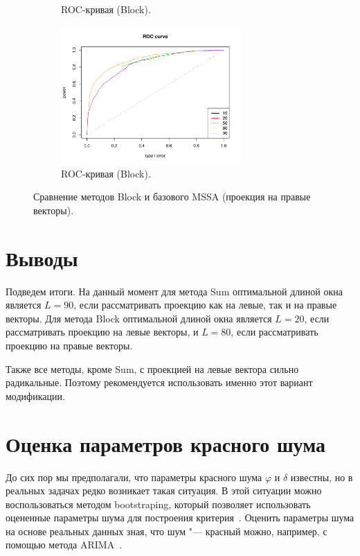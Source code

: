 \documentclass[specialist,
substylefile = spbu_report.rtx,
subf,href,colorlinks=true, 12pt]{disser}
\theoremstyle{definition}
\begin{document}
\begin{figure}
\begin{subfigure}[t]{0.45\textwidth}
		\caption{ROC-кривая (Block).}
	\end{subfigure}\hspace{\fill}
	\begin{subfigure}[t]{0.45\textwidth}
		\centering
		\includegraphics[width=0.75\textwidth]{img/roc_mssa_fa.pdf}
		\caption{ROC-кривая (Block).}
	\end{subfigure}
	\caption{Сравнение методов Block и базового MSSA (проекция на правые векторы).}
	\label{fig:block_fa}
\end{figure}
\section{Выводы}
Подведем итоги. На данный момент для метода Sum оптимальной длиной окна является $L=90$, если рассматривать проекцию как на левые, так и на правые векторы. Для метода Block оптимальной длиной окна является $L=20$, если рассматривать проекцию на левые векторы, и $L=80$, если рассматривать проекцию на правые векторы.

Также все методы, кроме Sum, с проекцией на левые вектора сильно радикальные. Поэтому рекомендуется использовать именно этот вариант модификации. 


\section{Оценка параметров красного шума}
До сих пор мы предполагали, что параметры красного шума $\varphi$ и $\delta$ известны, но в реальных задачах редко возникает такая ситуация. В этой ситуации можно воспользоваться методом bootstraping, который позволяет использовать оцененные параметры шума для построения критерия~\cite{Golyandina_2023}. Оценить параметры шума на основе реальных данных зная, что шум "--- красный можно, например, с помощью метода ARIMA~\cite{5}. 
\end{document}
